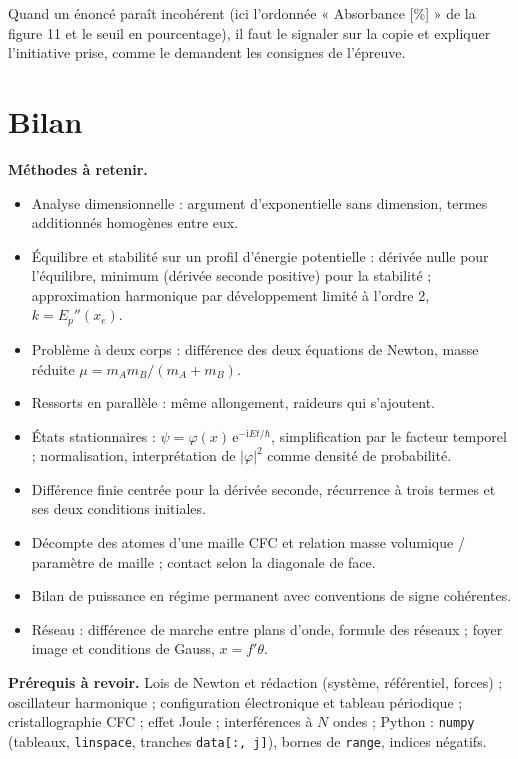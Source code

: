 \documentclass[11pt,a4paper]{article}
\providecommand{\tightlist}{\setlength{\itemsep}{0pt}\setlength{\parskip}{0pt}}
\begin{document}
\begin{jury}

Quand un énoncé paraît incohérent (ici l'ordonnée « Absorbance {[}\%{]} » de la figure 11 et le seuil en pourcentage), il faut le signaler sur la copie et expliquer l'initiative prise, comme le demandent les consignes de l'épreuve.

\end{jury}

\hypertarget{bilan}{%
\section{Bilan}\label{bilan}}

\textbf{Méthodes à retenir.}

\begin{itemize}
\tightlist
\item
  Analyse dimensionnelle : argument d'exponentielle sans dimension, termes additionnés homogènes entre eux.
\item
  Équilibre et stabilité sur un profil d'énergie potentielle : dérivée nulle pour l'équilibre, minimum (dérivée seconde positive) pour la stabilité ; approximation harmonique par développement limité à l'ordre 2, \(k = E_p''(x_e)\).
\item
  Problème à deux corps : différence des deux équations de Newton, masse réduite \(\mu = m_Am_B/(m_A + m_B)\).
\item
  Ressorts en parallèle : même allongement, raideurs qui s'ajoutent.
\item
  États stationnaires : \(\psi = \varphi(x)\,{\mathrm{e}}^{-\mathrm{i}Et/\hbar}\), simplification par le facteur temporel ; normalisation, interprétation de \(|\varphi|^2\) comme densité de probabilité.
\item
  Différence finie centrée pour la dérivée seconde, récurrence à trois termes et ses deux conditions initiales.
\item
  Décompte des atomes d'une maille CFC et relation masse volumique / paramètre de maille ; contact selon la diagonale de face.
\item
  Bilan de puissance en régime permanent avec conventions de signe cohérentes.
\item
  Réseau : différence de marche entre plans d'onde, formule des réseaux ; foyer image et conditions de Gauss, \(x = f'\theta\).
\end{itemize}

\textbf{Prérequis à revoir.} Lois de Newton et rédaction (système, référentiel, forces) ; oscillateur harmonique ; configuration électronique et tableau périodique ; cristallographie CFC ; effet Joule ; interférences à \(N\) ondes ; Python : \texttt{numpy} (tableaux, \texttt{linspace}, tranches \texttt{data{[}:,\ j{]}}), bornes de \texttt{range}, indices négatifs.
\end{document}
